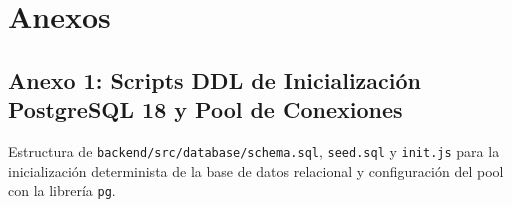 \documentclass[12pt,a4paper]{article}
\begin{document}
\vspace{0.4cm}

\section{Anexos}
\subsection*{Anexo 1: Scripts DDL de Inicialización PostgreSQL 18 y Pool de Conexiones}
Estructura de \texttt{backend/src/database/schema.sql}, \texttt{seed.sql} y \texttt{init.js} para la inicialización determinista de la base de datos relacional y configuración del pool con la librería \texttt{pg}.
\end{document}
